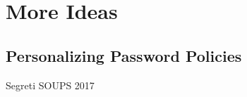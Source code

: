 \chapter[More Ideas]{More Ideas}\label{chap:pst_ideas}

\section{Personalizing Password Policies}

Segreti \etal SOUPS 2017

\cite{Seitz2017PPT}